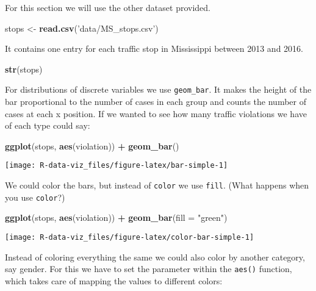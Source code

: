 \documentclass[]{book}
\newenvironment{Shaded}{\begin{snugshade}}{\end{snugshade}}
\newcommand{\KeywordTok}[1]{\textcolor[rgb]{0.13,0.29,0.53}{\textbf{#1}}}
\newcommand{\DataTypeTok}[1]{\textcolor[rgb]{0.13,0.29,0.53}{#1}}
\newcommand{\StringTok}[1]{\textcolor[rgb]{0.31,0.60,0.02}{#1}}
\newcommand{\OperatorTok}[1]{\textcolor[rgb]{0.81,0.36,0.00}{\textbf{#1}}}
\newcommand{\NormalTok}[1]{#1}
\theoremstyle{definition}
\theoremstyle{definition}
\theoremstyle{definition}
\theoremstyle{remark}
\begin{document}
For this section we will use the other dataset provided.

\begin{Shaded}
\begin{Highlighting}[]
\NormalTok{stops <-}\StringTok{ }\KeywordTok{read.csv}\NormalTok{(}\StringTok{'data/MS_stops.csv'}\NormalTok{)}
\end{Highlighting}
\end{Shaded}

It contains one entry for each traffic stop in Mississippi between 2013
and 2016.

\begin{Shaded}
\begin{Highlighting}[]
\KeywordTok{str}\NormalTok{(stops)}
\end{Highlighting}
\end{Shaded}

For distributions of discrete variables we use \texttt{geom\_bar}. It
makes the height of the bar proportional to the number of cases in each
group and counts the number of cases at each x position. If we wanted to
see how many traffic violations we have of each type could say:

\begin{Shaded}
\begin{Highlighting}[]
\KeywordTok{ggplot}\NormalTok{(stops, }\KeywordTok{aes}\NormalTok{(violation)) }\OperatorTok{+}\StringTok{ }
\StringTok{  }\KeywordTok{geom_bar}\NormalTok{()}
\end{Highlighting}
\end{Shaded}

\texttt{[image: R-data-viz\_files/figure-latex/bar-simple-1]}

We could color the bars, but instead of \texttt{color} we use
\texttt{fill}. (What happens when you use \texttt{color}?)

\begin{Shaded}
\begin{Highlighting}[]
\KeywordTok{ggplot}\NormalTok{(stops, }\KeywordTok{aes}\NormalTok{(violation)) }\OperatorTok{+}\StringTok{ }
\StringTok{  }\KeywordTok{geom_bar}\NormalTok{(}\DataTypeTok{fill =} \StringTok{"green"}\NormalTok{)}
\end{Highlighting}
\end{Shaded}

\texttt{[image: R-data-viz\_files/figure-latex/color-bar-simple-1]}

Instead of coloring everything the same we could also color by another
category, say gender. For this we have to set the parameter within the
\texttt{aes()} function, which takes care of mapping the values to
different colors:
\end{document}
